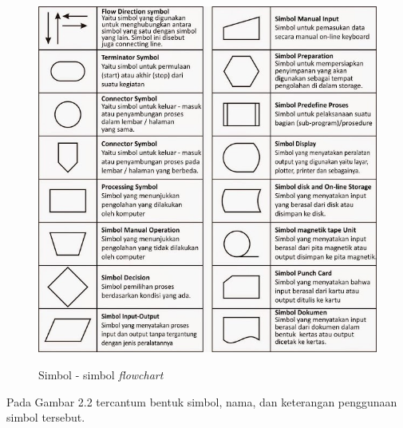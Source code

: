 \begin{flushleft}
\begin{justify}
            \begin{figure}[ht]
                \centering
                \includegraphics[width=12cm]{images/bab 2/symbol-fc.jpeg}\\
                \caption{Simbol - simbol \textit{flowchart}}
            \end{figure}
            \noindent Pada Gambar 2.2 tercantum bentuk simbol, nama, dan keterangan penggunaan simbol tersebut.\\

           
         


\end{justify}
\end{flushleft}
